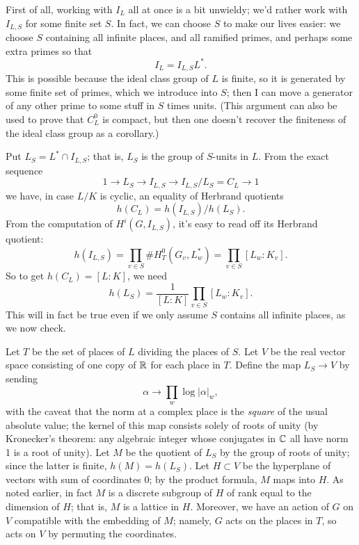 First of all, working with $I_L$ all at once is a bit unwieldy; we'd rather
work with $I_{L,S}$ for some finite set $S$. In fact, we can choose $S$ to
make our lives easier: we choose $S$ containing all infinite places,
and all ramified primes, and perhaps some extra primes so that
\[
I_L = I_{L,S} L^*.
\]
This is possible because the ideal class group of $L$ is finite, so 
it is generated by some finite set of primes, which we introduce into $S$; then I can
move a generator of any other prime to some stuff in $S$ times units.
(This argument can also be used to prove that $C^0_L$ is compact, but then one doesn't recover the finiteness of the ideal class group as a corollary.)

%
Put $L_S = L^* \cap I_{L,S}$; that is, $L_S$ is the group of $S$-units
in $L$. From the exact sequence
\[
1 \to L_S \to I_{L,S} \to I_{L,S}/L_S = C_L \to 1
\]
we have, in case $L/K$ is cyclic, an equality of Herbrand quotients
\[
h(C_L) = h(I_{L,S})/h(L_S).
\]
From the computation of $H^i(G, I_{L,S})$, it's easy to read off its
Herbrand quotient:
\[
h(I_{L,S}) = \prod_{v \in S} \#H^0_T(G_v, L_w^*)= \prod_{v \in S}
[L_w:K_v].
\]
So to get $h(C_L) = [L:K]$, we need
\[
h(L_S) = \frac{1}{[L:K]} \prod_{v \in S} [L_w:K_v].
\]
This will in fact be true even if we only assume $S$ contains all infinite
places, as we now check.

Let $T$ be the set of places of $L$ dividing the places of $S$.
Let $V$ be the real vector space consisting of one copy of $\mathbb{R}$ for
each place in $T$. Define the map $L_S \to V$ by sending
\[
\alpha \to \prod_w \log |\alpha|_w,
\]
with the caveat that the norm at a complex place is the \emph{square} of
the usual absolute value; the kernel of this map consists solely of roots
of unity (by Kronecker's theorem: any algebraic integer whose conjugates in $\mathbb{C}$ all have norm 1 is a root of unity). Let $M$ be the quotient of $L_S$ by the group of roots of unity;
since the latter is finite, $h(M) = h(L_S)$.
Let $H \subset V$ be the hyperplane of vectors
with sum of coordinates 0; by the product formula, $M$ maps into $H$.
As noted earlier, in fact $M$ is a discrete subgroup of $H$ of rank equal
to the dimension of $H$; that is, $M$ is a lattice in $H$. Moreover,
we have an action of $G$ on $V$ compatible with the embedding of $M$;
namely, $G$ acts on the places in $T$, so acts on $V$ by permuting the
coordinates.

